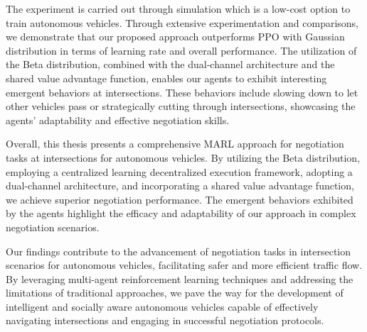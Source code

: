 \begin{e-abstract}
The experiment is carried out through simulation which is a low-cost option to train autonomous vehicles. Through extensive experimentation and comparisons, we demonstrate that our proposed approach outperforms PPO with Gaussian distribution in terms of learning rate and overall performance. The utilization of the Beta distribution, combined with the dual-channel architecture and the shared value advantage function, enables our agents to exhibit interesting emergent behaviors at intersections. These behaviors include slowing down to let other vehicles pass or strategically cutting through intersections, showcasing the agents' adaptability and effective negotiation skills.

Overall, this thesis presents a comprehensive MARL approach for negotiation tasks at intersections for autonomous vehicles. By utilizing the Beta distribution, employing a centralized learning decentralized execution framework, adopting a dual-channel architecture, and incorporating a shared value advantage function, we achieve superior negotiation performance. The emergent behaviors exhibited by the agents highlight the efficacy and adaptability of our approach in complex negotiation scenarios.

Our findings contribute to the advancement of negotiation tasks in intersection scenarios for autonomous vehicles, facilitating safer and more efficient traffic flow. By leveraging multi-agent reinforcement learning techniques and addressing the limitations of traditional approaches, we pave the way for the development of intelligent and socially aware autonomous vehicles capable of effectively navigating intersections and engaging in successful negotiation protocols.
\end{e-abstract}
